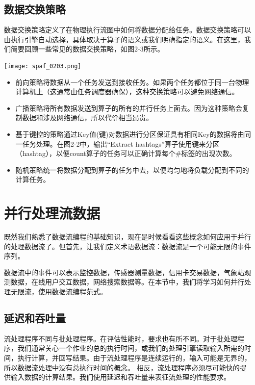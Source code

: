 \documentclass[oneside]{ctexbook}
\begin{document}
\subsection{数据交换策略}

数据交换策略定义了在物理执行流图中如何将数据分配给任务。数据交换策略可以由执行引擎自动选择，具体取决于算子的语义或我们明确指定的语义。在这里，我们简要回顾一些常见的数据交换策略，如图2-3所示。

\noindent\texttt{[image: spaf\_0203.png]}

\begin{itemize}
  \item 前向策略将数据从一个任务发送到接收任务。如果两个任务都位于同一台物理计算机上（这通常由任务调度器确保），这种交换策略可以避免网络通信。
  \item 广播策略将所有数据发送到算子的所有的并行任务上面去。因为这种策略会复制数据和涉及网络通信，所以代价相当昂贵。
  \item 基于键控的策略通过Key值(键)对数据进行分区保证具有相同Key的数据将由同一任务处理。在图2-2中，输出“Extract hashtags”算子使用键来分区（hashtag），以便count算子的任务可以正确计算每个\#标签的出现次数。
  \item 随机策略统一将数据分配到算子的任务中去，以便均匀地将负载分配到不同的计算任务。
\end{itemize}

\section{并行处理流数据}

既然我们熟悉了数据流编程的基础知识，现在是时候看看这些概念如何应用于并行的处理数据流了。但首先，让我们定义术语数据流：数据流是一个可能无限的事件序列。

数据流中的事件可以表示监控数据，传感器测量数据，信用卡交易数据，气象站观测数据，在线用户交互数据，网络搜索数据等。在本节中，我们将学习如何并行处理无限流，使用数据流编程范式。

\subsection{延迟和吞吐量}

流处理程序不同与批处理程序。在评估性能时，要求也有所不同。对于批处理程序，我们通常关心一个作业的总的执行时间，或我们的处理引擎读取输入所需的时间，执行计算，并回写结果。由于流处理程序是连续运行的，输入可能是无界的，所以数据流处理中没有总执行时间的概念。
相反，流处理程序必须尽可能快的提供输入数据的计算结果。我们使用延迟和吞吐量来表征流处理的性能要求。
\end{document}
